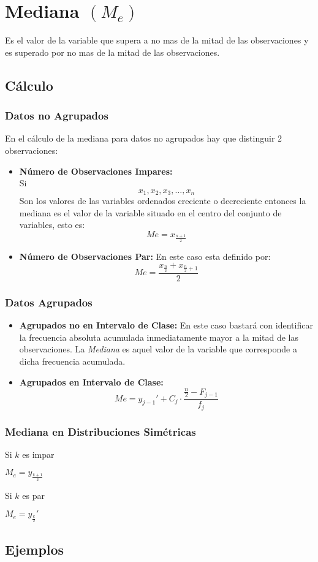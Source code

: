 \section{Mediana $(M_e)$}
Es el valor de la variable que supera a no mas de la mitad de las observaciones y es superado por no mas de la mitad de las observaciones.
\subsection{Cálculo}
\subsubsection{Datos no Agrupados}
En el cálculo de la mediana para datos no agrupados hay que distinguir 2 observaciones:
\begin{itemize}
\item \textbf{Número de Observaciones Impares:} \\${ }$\\ Si 
$$x_1,x_2,x_3,\ldots,x_n$$
Son los valores de las variables ordenados creciente o decreciente entonces la mediana es el valor de la variable situado en el centro del conjunto de variables, esto es:
$$Me=x_{\frac{n+1}{2}}$$
\item \textbf{Número de Observaciones Par:} En este caso esta definido por:
$$Me=\dfrac{x_{\frac{n}{2}}+x_{\frac{n}{2}+1}}{2}$$
\end{itemize}
\subsubsection{Datos Agrupados}
\begin{itemize}
\item \textbf{Agrupados no en Intervalo de Clase:}
En este caso bastará con identificar la frecuencia absoluta acumulada inmediatamente mayor a la mitad de las observaciones. La \textit{Mediana} es aquel valor de la variable que corresponde a dicha frecuencia acumulada.
\item \textbf{Agrupados en Intervalo de Clase:}
$$Me=y_{j-1}'+C_j\cdot \dfrac{\frac{n}{2}-F_{j-1}}{f_j}$$
\end{itemize}
\subsubsection{Mediana en Distribuciones Simétricas}
\begin{multicols}{2}
Si $k$ es impar
\begin{center}
$M_e=y_{\frac{k+1}{2}}$
\end{center}
\columnbreak
Si $k$ es par
\begin{center}
$M_e=y_{\frac{k}{2}}'$
\end{center}
\end{multicols}
\subsection{Ejemplos}